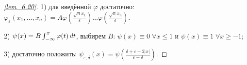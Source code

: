 \begin{proof}[\ref{lem_6.20}]
	
	1) для введённой $\varphi$ достаточно: $\varphi_\varepsilon (x_1,\ldots,x_n) = A \varphi\left(\frac{\sqrt{n} x_1}{\varepsilon}\right)\ldots\varphi\left(\frac{\sqrt{n} x_n}{\varepsilon}\right)$.

	2) $\psi(x) = B \int_{-\infty}^x \varphi(t) \, d t $, выбирем $B$: $\psi(x) \equiv 0 \; \forall x \leq 1$ и $\psi(x) \equiv 1 \; \forall x \geq -1$;

	3) достаточно положить: $\psi_{\varepsilon,\delta} (x) = \psi \left(\frac{\delta +\varepsilon -2|x|}{\varepsilon-\delta}\right)$.
\end{proof}